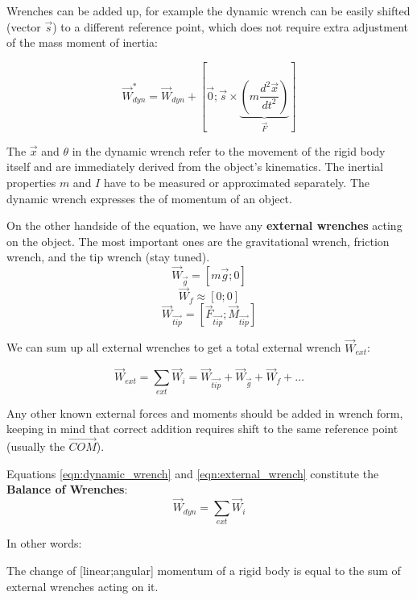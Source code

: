 Wrenches can be added up, for example the dynamic wrench can be easily shifted (vector \(\vec{s}\)) to a different reference point, which does not require extra adjustment of the mass moment of inertia:
\begin{change}
\begin{equation}\label{eqn:shift_wrench}
\vec{W}_{dyn}^{*} = \vec{W}_{dyn} + [ \vec{0}; \vec{s} \times \underbrace{(m\frac{d^2\vec{x}}{dt^2})}_{\vec{F}} ]
\end{equation}
\end{change}



The \(\vec{x}\) and \(\theta\) in the dynamic wrench refer to the movement of the rigid body itself and are immediately derived from the object's kinematics.
The inertial properties \(m\) and \(I\) have to be measured or approximated separately.
The dynamic wrench expresses the  of momentum of an object.


On the other handside of the equation, we have any \textbf{external wrenches} acting on the object.
The most important ones are the gravitational wrench, friction wrench, and the tip wrench (stay tuned).
\[\vec{W}_{\vec{g}} = \left[ m\vec{g}; 0 \right]\]
\[\vec{W}_{f} \approx \left[ 0; 0 \right]\]
\[\vec{W}_{\vec{tip}} = \left[ \vec{F}_{\vec{tip}}; \vec{M}_{\vec{tip}} \right]\]

We can sum up all external wrenches to get a total external wrench \(\vec{W}_{ext}\):
\begin{change}
\begin{equation}\label{eqn:external_wrench}
\vec{W}_{ext} = \sum\limits_{ext} \vec{W}_{i} = \vec{W}_{\vec{tip}} +\vec{W}_{\vec{g}}+\vec{W}_{f}+\ldots
\end{equation}
\end{change}

Any other known external forces and moments should be added in wrench form, keeping in mind that correct addition requires shift to the same reference point (usually the \(\vec{COM}\)).


Equations \eqref{eqn:dynamic_wrench} and \eqref{eqn:external_wrench} constitute the \textbf{Balance of Wrenches}:
\begin{equation}\label{eqn:balance_of_wrenches}
\vec{W}_{dyn} = \sum\limits_{ext} \vec{W}_{i}
\end{equation}


\newpage
In other words:
\begin{center}
The  change of [linear;angular] momentum of a rigid body is equal to the sum of external wrenches acting on it.
\end{center}


